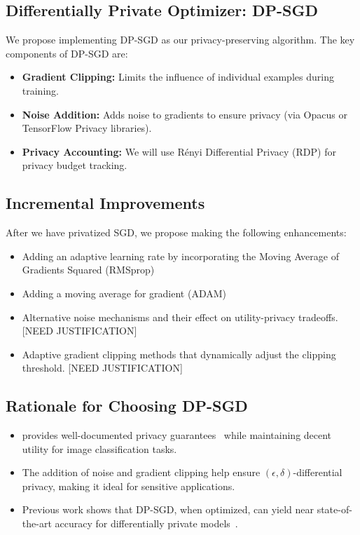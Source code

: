 \subsection{Differentially Private Optimizer: DP-SGD}\label{subsec:differentially-private-optimizer:-dp-sgd}
We propose implementing DP-SGD as our privacy-preserving algorithm.
The key components of DP-SGD are:
\begin{itemize}
    \item \textbf{Gradient Clipping:} Limits the influence of individual examples during training.
    \item \textbf{Noise Addition:} Adds noise to gradients to ensure privacy (via Opacus or TensorFlow Privacy libraries).
    \item \textbf{Privacy Accounting:} We will use Rényi Differential Privacy (RDP) for privacy budget tracking.
\end{itemize}

\subsection{Incremental Improvements}\label{subsec:incremental-improvements}
After we have privatized SGD, we propose making the following enhancements:
\begin{itemize}
    \item Adding an adaptive learning rate by incorporating the Moving Average of Gradients Squared (RMSprop)~\cite{DBLP:journals/corr/abs-1807-06766}
    \item Adding a moving average for gradient (ADAM)~\cite{DBLP:journals/corr/abs-1807-06766}
    \item Alternative noise mechanisms and their effect on utility-privacy tradeoffs. [NEED JUSTIFICATION]
    \item Adaptive gradient clipping methods that dynamically adjust the clipping threshold. [NEED JUSTIFICATION]
\end{itemize}

\subsection{Rationale for Choosing DP-SGD}\label{subsec:rationale-for-choosing-dp-sgd}
\begin{itemize}
    \item provides well-documented privacy guarantees~\cite{Abadi_2016_DeepLearningDifferentialPrivacy}
    while maintaining decent utility for image classification tasks.
    \item The addition of noise and gradient clipping help ensure $(\epsilon, \delta)$-differential privacy,
    making it ideal for sensitive applications.
    \item Previous work shows that DP-SGD, when optimized, can yield near state-of-the-art accuracy
    for differentially private models~\cite{De_2022_ScaleDP_ImageClassification}.
\end{itemize}

